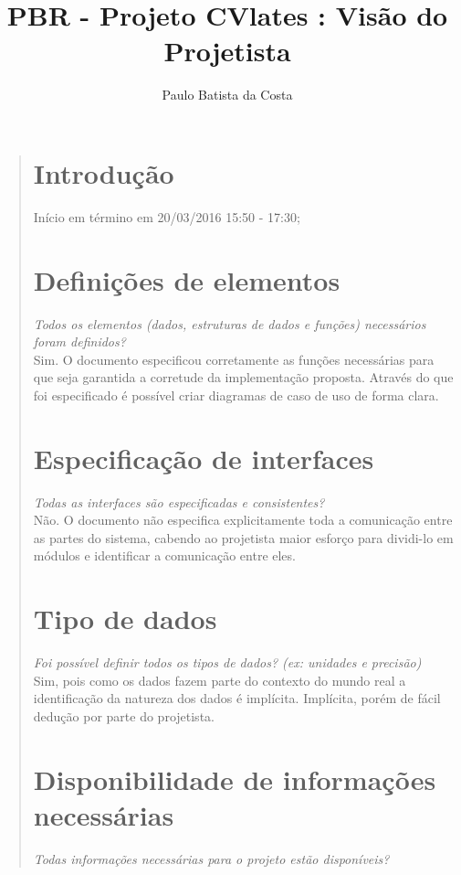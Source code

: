 \documentclass[12pt,a4paper]{report}
\author{Paulo Batista da Costa}
\title{PBR - Projeto CVlates : Visão do Projetista}
\begin{document}
\maketitle
\tableofcontents
\begin{quotation}
\newpage
\section{Introdução}
Início em término em 20/03/2016 15:50 - 17:30;
\section{Definições de elementos}
\textit{Todos os elementos (dados, estruturas de dados e funções) necessários foram definidos?}  \vspace{0.3cm}\\ 

 Sim. O documento especificou corretamente as funções necessárias para que seja garantida a corretude da implementação proposta. Através do que foi especificado é possível criar diagramas de caso de uso de forma clara. 
\section{Especificação de interfaces}
\textit{Todas as interfaces são especificadas e consistentes?} \vspace{0.3cm}\\ 

Não. O documento não especifica explicitamente toda a comunicação entre as partes do sistema, cabendo ao projetista maior esforço para dividi-lo  em módulos e identificar a comunicação entre eles. 
\section{Tipo de dados}
\textit{Foi possível definir todos os tipos de dados? (ex: unidades e precisão)}\vspace{0.3cm}\\ 

Sim, pois como os dados fazem parte do contexto do mundo real a identificação da natureza dos dados é implícita. Implícita, porém de fácil dedução por parte do projetista.
\newpage
\section{Disponibilidade de informações necessárias}
\textit{Todas informações necessárias para o projeto estão disponíveis?}\vspace{0.3cm}\\


\end{quotation}
\end{document}

